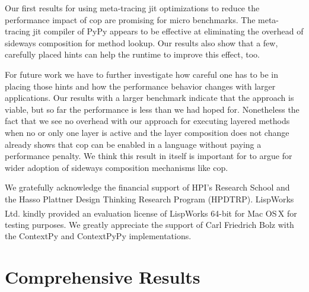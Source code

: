 \documentclass[preprint,english,10pt,nonatbib]{sigplanconf}
\begin{document}
Our first results for using meta-tracing \ac{jit} optimizations to reduce the
performance impact of \ac{cop} are promising for micro benchmarks. The
meta-tracing \ac{jit} compiler of PyPy appears to be effective at eliminating
the overhead of sideways composition for method lookup. Our results also show
that a few, carefully placed hints can help the runtime to improve this effect,
too.

For future work we have to further investigate how careful one has to be in
placing those hints and how the performance behavior changes with larger
applications. Our results with a larger benchmark indicate that the approach is
viable, but so far the performance is less than we had hoped for. Nonetheless
the fact that we see no overhead with our approach for executing layered methods
when no or only one layer is active and the layer composition does not change
already shows that \ac{cop} can be enabled in a language without paying a
performance penalty. We think this result in itself is important for to argue
for wider adoption of sideways composition mechanisms like \ac{cop}.

\acks
We gratefully acknowledge the financial support of HPI's Research School and
the Hasso Plattner Design Thinking Research Program (HPDTRP).
LispWorks Ltd. kindly provided an evaluation license of
LispWorks\textsuperscript{\textregistered} 64-bit for Mac OS\,X for testing
purposes. We greatly appreciate the support of Carl Friedrich Bolz with the
ContextPy and ContextPyPy implementations.
\printbibliography
\appendix
{}
\section{Comprehensive Results}


\end{document}
